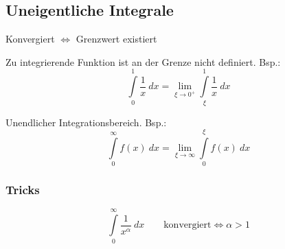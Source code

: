 \subsection{Uneigentliche Integrale}\vspace{3pt}

    \begin{center}
        Konvergiert $\Longleftrightarrow$ Grenzwert existiert
    \end{center}
    
    \vspace{3pt}
    
            Zu integrierende Funktion ist an der Grenze nicht definiert. Bsp.:
            $$
                \int\limits_{0}^{1}  \frac{1}{x} \ dx = \lim_{\xi \to 0^+} \int\limits_{\xi}^{1} \frac{1}{x} \ dx
            $$
    \vspace{3pt}
    
        Unendlicher Integrationsbereich. Bsp.:
        $$
            \int\limits_{0}^{\infty}  f(x) \ dx = \lim_{\xi \to \infty}\int\limits_{0}^{\xi} f(x) \ dx
        $$
    \subsubsection{Tricks}
        \vspace{-0.5em}
        $$
            \int\limits_{0}^{\infty}  \frac{1}{x^\alpha} \ dx  \qquad \text{konvergiert} \iff \alpha > 1       
        $$